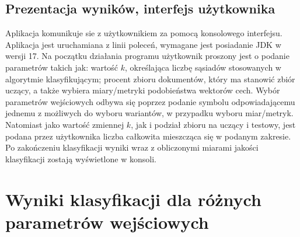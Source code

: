\documentclass{classrep}
\begin{document}
\subsection{Prezentacja wyników, interfejs użytkownika}  
Aplikacja komunikuje sie z użytkownikiem za pomocą konsolowego interfejsu. Aplikacja jest uruchamiana z linii poleceń, wymagane jest posiadanie JDK w wersji 17. Na początku działania programu użytkownik proszony jest o podanie parametrów takich jak:  
wartość $k$, określająca liczbę sąsiadów stosowanych w algorytmie klasyfikującym; 
procent zbioru dokumentów, który ma stanowić zbiór uczący, a także wybiera miary/metryki podobieństwa wektorów cech. Wybór parametrów wejściowych odbywa się poprzez podanie
symbolu odpowiadającemu jednemu z możliwych do wyboru wariantów, w przypadku wyboru miar/metryk. Natomiast jako wartość zmiennej $k$, jak i podział zbioru na uczący i testowy, jest podana przez użytkownika liczba całkowita mieszcząca się w podanym zakresie.
Po zakończeniu klasyfikacji wyniki wraz z obliczonymi miarami jakości klasyfikacji zostają wyświetlone w konsoli.




\section{Wyniki klasyfikacji dla różnych parametrów wejściowych}


\end{document}
